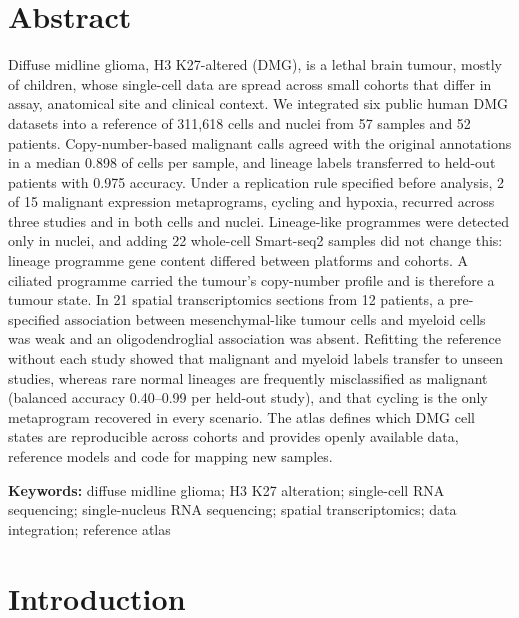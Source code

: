 \documentclass[11pt,a4paper]{article}
\begin{document}
\section{Abstract}
Diffuse midline glioma, H3 K27-altered (DMG), is a lethal brain tumour, mostly of children, whose single-cell data are
spread across small cohorts that differ in assay, anatomical site and clinical context. We integrated six public human
DMG datasets into a reference of 311,618 cells and nuclei from 57 samples and 52 patients. Copy-number-based malignant
calls agreed with the original annotations in a median 0.898 of cells per sample, and lineage labels transferred to
held-out patients with 0.975 accuracy. Under a replication rule specified before analysis, 2 of 15 malignant expression
metaprograms, cycling and hypoxia, recurred across three studies and in both cells and nuclei. Lineage-like programmes
were detected only in nuclei, and adding 22 whole-cell Smart-seq2 samples did not change this: lineage programme gene
content differed between platforms and cohorts. A ciliated programme carried the tumour's copy-number profile and is
therefore a tumour state. In 21 spatial transcriptomics sections from 12 patients, a pre-specified association between
mesenchymal-like tumour cells and myeloid cells was weak and an oligodendroglial association was absent. Refitting the reference without each study showed that malignant
and myeloid labels transfer to unseen studies, whereas rare normal lineages are frequently misclassified as malignant
(balanced accuracy 0.40--0.99 per held-out study), and that cycling is the only metaprogram recovered in every
scenario. The atlas defines which DMG cell states are reproducible across cohorts and provides openly available data,
reference models and code for mapping new samples.

\medskip
\noindent\textbf{Keywords:} diffuse midline glioma; H3 K27 alteration; single-cell RNA sequencing; single-nucleus RNA
sequencing; spatial transcriptomics; data integration; reference atlas

\newpage
\onehalfspacing
\linenumbers

\section{Introduction}
\end{document}
